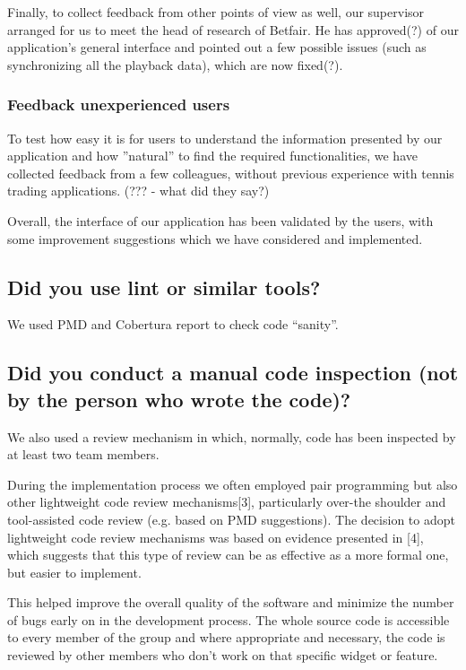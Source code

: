 \documentclass[10pt]{article}
\begin{document}
Finally, to collect feedback from other points of view as well, our supervisor arranged for us to meet the head of research of Betfair. He has approved(?) of our application's general interface and pointed out a few possible issues (such as synchronizing all the playback data), which are now fixed(?).

\subsubsection{Feedback unexperienced users}

To test how easy it is for users to understand the information presented by our application and how ''natural'' to find the required functionalities, we have collected feedback from a few colleagues, without previous experience with tennis trading applications. (??? - what did they say?)

Overall, the interface of our application has been validated by the users, with some improvement suggestions which we have considered and implemented.


\subsection{Did you use lint or similar tools?}

We used PMD and Cobertura report to check code ``sanity''.

\subsection{Did you conduct a manual code inspection (not by the person who wrote the code)?}

We also used a review mechanism in which, normally, code has been inspected by at least two team members.


During the implementation process we often employed pair programming but also other lightweight code review mechanisms[3], particularly over-the shoulder and tool-assisted code review (e.g. based on PMD suggestions).
The decision to adopt lightweight code review mechanisms was based on evidence presented in [4], which suggests that this type of review can be as effective as a more formal one, but easier to implement.

This helped improve the overall quality of the software and minimize the number of bugs early on in the development process.
The whole source code is accessible to every member of the group and where appropriate and necessary, the code is reviewed by other members who don’t work on that specific widget or feature. 
\end{document}

